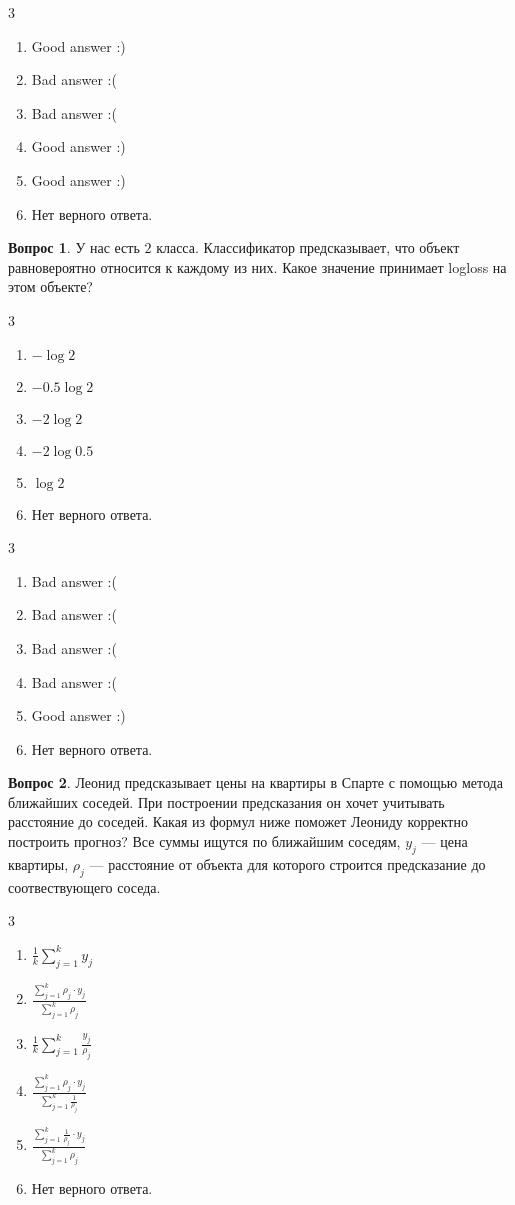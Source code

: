 \documentclass[12pt]{article}
\newenvironment{answerlist}[1][3]{
\begin{multicols}{#1}

\begin{enumerate}[label=\fbox{\emph{\Alph*}},ref=\emph{\alph*}]
}
{
\item Нет верного ответа.
\end{enumerate}
\end{multicols}
}
\theoremstyle{definition}
\newtheorem{question}{Вопрос}
\begin{document}
\begin{solution}
\begin{answerlist}
  \item Good answer :)
  \item Bad answer :(
  \item Bad answer :(
  \item Good answer :)
  \item Good answer :)
\end{answerlist}
\end{solution}


\begin{question}
У нас есть $2$ класса. Классификатор предсказывает, что объект равновероятно относится к каждому из них. Какое значение принимает logloss на этом объекте? 
\begin{answerlist}
  \item \(-\log 2 \)
  \item \(-0.5 \log 2 \)
  \item \(-2 \log 2 \)
  \item \(-2 \log 0.5 \)
  \item \(\log 2\)
\end{answerlist}
\end{question}

\begin{solution}
\begin{answerlist}
  \item Bad answer :(
  \item Bad answer :(
  \item Bad answer :(
  \item Bad answer :(
  \item Good answer :)
\end{answerlist}
\end{solution}


\begin{question}
Леонид предсказывает цены на квартиры в Спарте с помощью метода ближайших соседей. При построении предсказания он хочет учитывать расстояние до соседей. Какая из формул ниже поможет Леониду корректно построить прогноз?  Все суммы ищутся по ближайшим соседям, $y_j$ --- цена квартиры, $\rho_j$ --- расстояние от объекта для которого строится предсказание до соотвествующего соседа.
\begin{answerlist}
   \item \(\frac{1}{k} \sum_{j=1}^k y_j\)
   \item \(\frac{\sum_{j=1}^k \rho_j \cdot y_j }{\sum_{j=1}^k \rho_j} \) 
   \item \(\frac{1}{k} \sum_{j=1}^k \frac{y_j}{\rho_j} \) 
   \item \(\frac{\sum_{j=1}^k \rho_j \cdot y_j }{\sum_{j=1}^k \tfrac{1}{\rho_j}} \) 
   \item \(\frac{\sum_{j=1}^k \tfrac{1}{\rho_j} \cdot y_j }{\sum_{j=1}^k \rho_j} \)
\end{answerlist}
\end{question}
\end{document}
